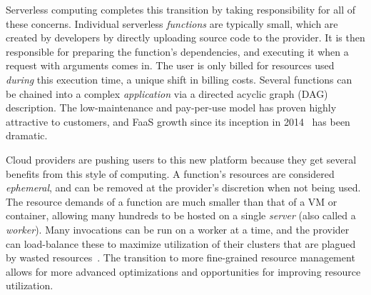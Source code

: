 Serverless computing completes this transition by taking responsibility for all of these concerns.
Individual serverless \emph{functions} are typically small, which are created by developers by directly uploading source code to the provider.
It is then responsible for preparing the function's dependencies, and executing it when a request with arguments comes in.
The user is only billed for resources used \emph{during} this execution time, a unique shift in billing costs.
Several functions can be chained into a complex \emph{application} via a directed acyclic graph (DAG) description.
The low-maintenance and pay-per-use model has proven highly attractive to customers, and FaaS growth since its inception in 2014~\cite{lambda} has been dramatic.

Cloud providers are pushing users to this new platform because they get several benefits from this style of computing.
A function's resources are considered \emph{ephemeral}, and can be removed at the provider's discretion when not being used.
The resource demands of a function are much smaller than that of a VM or container, allowing many hundreds to be hosted on a single \emph{server} (also called a \emph{worker}).
Many invocations can be run on a worker at a time, and the provider can load-balance these to maximize utilization of their clusters that are plagued by wasted resources~\cite{fuerst2020cloud,fuerst2022memory,wang2021smartharvest,serverless-harvest-sosp21,harvest-osdi20}.
The transition to more fine-grained resource management allows for more advanced optimizations and opportunities for improving resource utilization.

